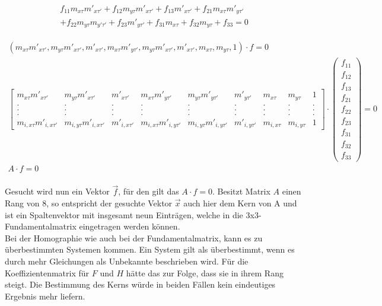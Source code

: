 \begin{gather}
\begin{split}
	f_{11}m_{x\tau}m'_{x\tau'}+f_{12}m_{y\tau}m'_{x\tau'}+f_{13}m'_{x\tau'}+f_{21}m_{x\tau}m'_{y\tau'}\\
	+f_{22}m_{y\tau}m_{y'\tau'}+f_{23}m'_{y\tau'}+f_{31}m_{x\tau}+f_{32}m_{y\tau}+f_{33} =0
\end{split} \label{eq:F}
\end{gather}

\begin{gather*}
	(m_{x\tau}m'_{x\tau'},m_{y\tau}m'_{x\tau'},m'_{x\tau'},m_{x\tau}m'_{y\tau'},m_{y\tau}m'_{x\tau'},m'_{x\tau'},m_{x\tau},m_{y\tau},1)\cdot f =0\\
	\begin{bmatrix}
		m_{x\tau}m'_{x\tau'}&m_{y\tau}m'_{x\tau'}&m'_{x\tau'}&m_{x\tau}m'_{y\tau'}&m_{y\tau}m'_{y\tau'}&m'_{y\tau'}&m_{x\tau}&m_{y\tau}&1\\
		.&.&.&.&.&.&.&.&.\\
		.&.&.&.&.&.&.&.&.\\
		.&.&.&.&.&.&.&.&.\\
		m_{i,x\tau}m'_{i,x\tau'}&m_{i,y\tau}m'_{i,x\tau'}&m'_{i,x\tau'}&m_{i,x\tau}m'_{i,y\tau'}&m_{i,y\tau}m'_{i,y\tau'}&m'_{i,y\tau'}&m_{i,x\tau}&m_{i,y\tau}&1
	\end{bmatrix}
	\cdot 
	\begin{pmatrix}
		f_{11}\\f_{12}\\f_{13}\\f_{21}\\f_{22}\\f_{23}\\f_{31}\\f_{32}\\f_{33}
	\end{pmatrix}
	= 0\\
	A\cdot f = 0
\end{gather*}\\


Gesucht wird nun ein Vektor $\vec{f}$, für den gilt das $A \cdot f = 0$. Besitzt Matrix $A$ einen Rang von 8, so entspricht der gesuchte Vektor $\vec{x}$ auch hier dem Kern von A und ist ein Spaltenvektor mit insgesamt neun Einträgen, welche in die 3x3-Fundamentalmatrix eingetragen werden können\cite{HZ,ZZGXr}.\\


Bei der Homographie wie auch bei der Fundamentalmatrix, kann es zu überbestimmten Systemen kommen. Ein System gilt als überbestimmt, wenn es durch mehr Gleichungen als Unbekannte beschrieben wird\cite{Schwarz,Scholz}. Für die Koeffizientenmatrix für $F$ und $H$ hätte das zur Folge, dass sie in ihrem Rang steigt. Die Bestimmung des Kerns würde in beiden Fällen kein eindeutiges Ergebnis mehr liefern\cite{HZ,Schwarz}.\\


